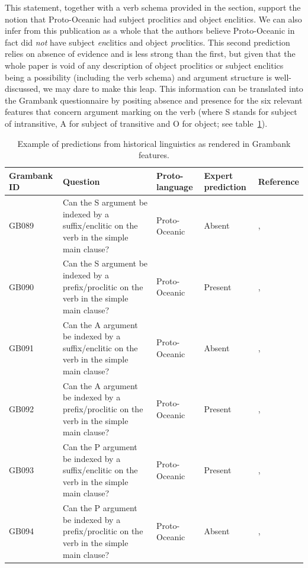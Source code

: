 \documentclass[a4paper,10pt]{article} %
\begin{document}
This statement, together with a verb schema provided in the section, support the notion that Proto-Oceanic had subject proclitics and object enclitics. We can also infer from this publication as a whole that the authors believe Proto-Oceanic in fact did \emph{not} have subject \emph{en}clitics and object \emph{pro}clitics. This second prediction relies on absence of evidence and is less strong than the first, but given that the whole paper is void of any description of object proclitics or subject enclitics being a possibility (including the verb schema) and argument structure is well-discussed, we may dare to make this leap. This information can be translated into the Grambank questionnaire by positing absence and presence for the six relevant features that concern argument marking on the verb (where S stands for subject of intransitive, A for subject of transitive and O for object; see table~\ref{example_HL_prediction_table}).

\begin{table}[H] %
\centering
\caption{Example of predictions from historical linguistics as rendered in Grambank features.}
\label{example_HL_prediction_table}
\begin{tabular}{|l| p{3cm}|  p{3cm}| p{3cm} | p{3cm} |}
\hline
\textbf{Grambank ID} & \textbf{Question} & \textbf{Proto-language} & \textbf{Expert prediction}& \textbf{Reference} \\ \hline
GB089  &Can the S argument be indexed by a suffix/enclitic on the verb in the simple main clause? &Proto-Oceanic &Absent & \citet[498-499]{ross2004morphosyntactic}, \citet[83]{lynchrosscrowley_proto_grammar_oceanic} \\ \hline
GB090 &Can the S argument be indexed by a prefix/proclitic on the verb in the simple main clause? &Proto-Oceanic &Present &\citet[498-499]{ross2004morphosyntactic}, \citet[83]{lynchrosscrowley_proto_grammar_oceanic}  \\ \hline
GB091 &Can the A argument be indexed by a suffix/enclitic on the verb in the simple main clause? &Proto-Oceanic &Absent &\citet[498-499]{ross2004morphosyntactic}, \citet[83]{lynchrosscrowley_proto_grammar_oceanic} \\ \hline
GB092  &Can the A argument be indexed by a prefix/proclitic on the verb in the simple main clause? &Proto-Oceanic &Present &\citet[498-499]{ross2004morphosyntactic}, \citet[83]{lynchrosscrowley_proto_grammar_oceanic}  \\ \hline
GB093  &Can the P argument be indexed by a suffix/enclitic on the verb in the simple main clause? &Proto-Oceanic &Present &\citet[498-499]{ross2004morphosyntactic}, \citet[83]{lynchrosscrowley_proto_grammar_oceanic} \\ \hline
GB094  &Can the P argument be indexed by a prefix/proclitic on the verb in the simple main clause? &Proto-Oceanic &Absent & \citet[498-499]{ross2004morphosyntactic}, \citet[83]{lynchrosscrowley_proto_grammar_oceanic} \\ \hline
\end{tabular}
\end{table}
\end{document}
